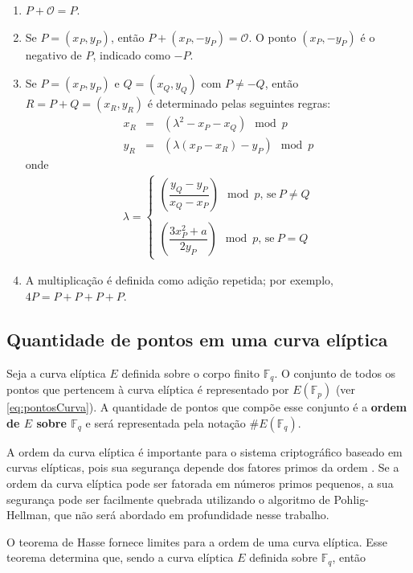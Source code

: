 \begin{enumerate}
  \item $P + \mathcal{O} = P$.
  \item Se $P = (x_P, y_P)$, então $P + (x_P, -y_P) = \mathcal{O}$. O ponto $(x_P, -y_P)$ é o negativo de \(P\), indicado como \(-P\).
  \item Se $P = (x_P, y_P)$ e $Q = (x_Q, y_Q)$ com $P \neq -Q$, então $R = P + Q = (x_R, y_R)$ é determinado pelas seguintes regras:
    \begin{eqnarray*}
    x_R &=& (\lambda^2 - x_P - x_Q) \mod p \\
    y_R &=& (\lambda(x_P - x_R) - y_P) \mod p
    \end{eqnarray*}
  onde
    \begin{eqnarray*}
    \lambda =
    \begin{cases}
    \left(\dfrac{y_Q - y_P}{x_Q - x_P}\right) \mod p \textrm{, se} \ P \neq Q \\ \\
    \left(\dfrac{3x_P^2 + a}{2y_P}\right) \mod p \textrm{, se} \ P = Q
    \end{cases}
    \end{eqnarray*}
  \item A multiplicação é definida como adição repetida; por exemplo, $4P = P + P + P + P$.
\end{enumerate}

%
%
\subsection{Quantidade de pontos em uma curva elíptica}
Seja a curva elíptica $E$ definida sobre o corpo finito $\mathbb{F}_q$. O conjunto de todos os pontos que pertencem à curva elíptica é representado por $E(\mathbb{F}_p)$ (ver \ref{eq:pontosCurva}). A quantidade de pontos que compõe esse conjunto é a \textbf{ordem de $E$ sobre $\mathbb{F}_q$} e será representada pela notação $\#E(\mathbb{F}_q)$. \cite{Guide}

A ordem da curva elíptica é importante para o sistema criptográfico baseado em curvas elípticas, pois sua segurança depende dos fatores primos da ordem \cite{Alvarado:2005}. Se a ordem da curva elíptica pode ser fatorada em números primos pequenos, a sua segurança pode ser facilmente quebrada utilizando o algoritmo de Pohlig-Hellman, que não será abordado em profundidade nesse trabalho.

O teorema de Hasse fornece limites para a ordem de uma curva elíptica. Esse teorema determina que, sendo a curva elíptica $E$ definida sobre $\mathbb{F}_q$, então

